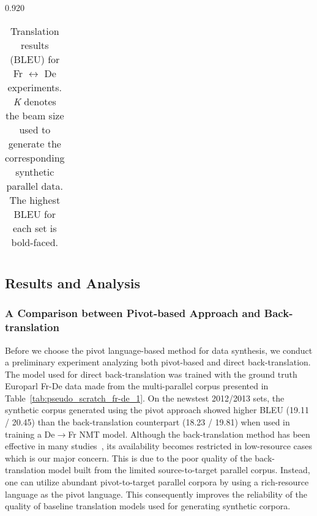 \documentclass[11pt,letterpaper]{article}
\newcommand{\mylinespacing}{0.920}
\begin{document}
\begin{spacing}{\mylinespacing}
\begin{table*}[t]
\begin{center}
\begin{tabular}{c||ccc||ccc}
\end{tabular}
\end{center}
\caption{Translation results (BLEU) for Fr \(\leftrightarrow\) De experiments. \textit{K} denotes the beam size used to generate the corresponding synthetic parallel data. The highest BLEU for each set is bold-faced.}
\label{tab:reason_of_improvement}
\end{table*}


\subsection{Results and Analysis}

\subsubsection{A Comparison between Pivot-based Approach and Back-translation}
Before we choose the pivot language-based method for data synthesis, we conduct a preliminary experiment analyzing both pivot-based and direct back-translation. The model used for direct back-translation was trained with the ground truth Europarl Fr-De data made from the multi-parallel corpus presented in Table~\ref{tab:pseudo_scratch_fr-de_1}. On the newstest 2012/2013 sets, the synthetic corpus generated using the pivot approach showed higher BLEU (19.11 / 20.45) than the back-translation counterpart (18.23 / 19.81) when used in training a De\(\rightarrow\)Fr NMT model. Although the back-translation method has been effective in many studies~\cite{sennrich2015improving,sennrich2016edinburgh}, its availability becomes restricted in low-resource cases which is our major concern. This is due to the poor quality of the back-translation model built from the limited source-to-target parallel corpus. Instead, one can utilize abundant pivot-to-target parallel corpora by using a rich-resource language as the pivot language. This consequently improves the reliability of the quality of baseline translation models used for generating synthetic corpora.


\end{spacing}
\end{document}

